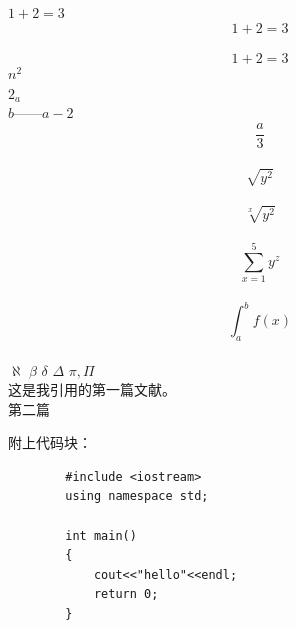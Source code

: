 \documentclass[a4paper, 12pt]{article}
\begin{document}
	$1+2=3$
	$$1+2=3$$\\%
	\begin{equation}
		1+2=3
	\end{equation}
	$n^2$\\%
	$2_a$\\%
	$b——{a-2}$\\%
	$$\frac{a}{3}$$\\%
	$$\sqrt{y^2}$$\\%
	$$\sqrt[x]{y^2}$$\\
	$$\sum_{x=1}^5 y^z$$\\%
	$$\int_a^b f(x)$$\\%
	$\aleph$
	$\beta$
	$\delta$
	$\Delta$
	$\pi,\Pi$
	\\这是我引用的第一篇文献\cite{1284395}。\\
	第二篇\cite{10335618}\\
	\cite{666}
	\newpage
	
	
	
	
	附上代码块：
	\begin{lstlisting}
		#include <iostream>
		using namespace std;
		
		int main()
		{
			cout<<"hello"<<endl;
			return 0;
		}
	\end{lstlisting}
\end{document}
